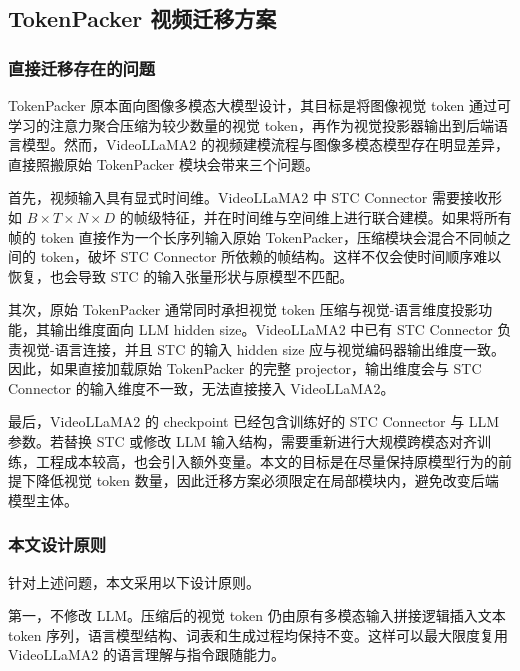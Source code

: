 \subsection{TokenPacker 视频迁移方案}

\subsubsection{直接迁移存在的问题}

\par TokenPacker 原本面向图像多模态大模型设计，其目标是将图像视觉 token 通过可学习的注意力聚合压缩为较少数量的视觉 token，再作为视觉投影器输出到后端语言模型\cite{tokenpacker2024}。然而，VideoLLaMA2 的视频建模流程与图像多模态模型存在明显差异，直接照搬原始 TokenPacker 模块会带来三个问题。

\par 首先，视频输入具有显式时间维。VideoLLaMA2 中 STC Connector 需要接收形如 $B\times T\times N\times D$ 的帧级特征，并在时间维与空间维上进行联合建模。如果将所有帧的 token 直接作为一个长序列输入原始 TokenPacker，压缩模块会混合不同帧之间的 token，破坏 STC Connector 所依赖的帧结构。这样不仅会使时间顺序难以恢复，也会导致 STC 的输入张量形状与原模型不匹配。

\par 其次，原始 TokenPacker 通常同时承担视觉 token 压缩与视觉-语言维度投影功能，其输出维度面向 LLM hidden size。VideoLLaMA2 中已有 STC Connector 负责视觉-语言连接，并且 STC 的输入 hidden size 应与视觉编码器输出维度一致。因此，如果直接加载原始 TokenPacker 的完整 projector，输出维度会与 STC Connector 的输入维度不一致，无法直接接入 VideoLLaMA2。

\par 最后，VideoLLaMA2 的 checkpoint 已经包含训练好的 STC Connector 与 LLM 参数。若替换 STC 或修改 LLM 输入结构，需要重新进行大规模跨模态对齐训练，工程成本较高，也会引入额外变量。本文的目标是在尽量保持原模型行为的前提下降低视觉 token 数量，因此迁移方案必须限定在局部模块内，避免改变后端模型主体。

\subsubsection{本文设计原则}

\par 针对上述问题，本文采用以下设计原则。

\par 第一，不修改 LLM。压缩后的视觉 token 仍由原有多模态输入拼接逻辑插入文本 token 序列，语言模型结构、词表和生成过程均保持不变。这样可以最大限度复用 VideoLLaMA2 的语言理解与指令跟随能力。

